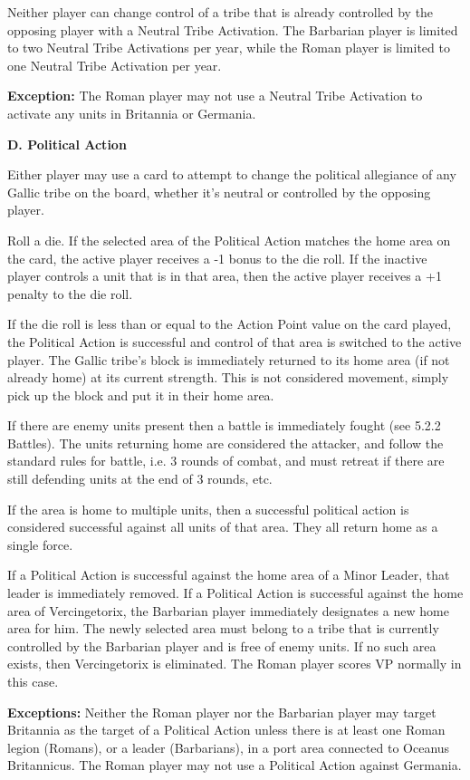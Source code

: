 Neither player can change control of a tribe that is already controlled by the opposing player with a Neutral Tribe Activation. The Barbarian player is limited to two Neutral Tribe Activations per year, while the Roman player is limited to one Neutral Tribe Activation per year.

\textbf{Exception:} The Roman player may not use a Neutral Tribe Activation to activate any units in Britannia or Germania.

\textbf{D. Political Action}
\par
Either player may use a card to attempt to change the political allegiance of any Gallic tribe on the board, whether it's neutral or controlled by the opposing player.

Roll a die. If the selected area of the Political Action matches the home area on the card, the active player receives a -1 bonus to the die roll. If the inactive player controls a unit that is in that area, then the active player receives a +1 penalty to the die roll.

If the die roll is less than or equal to the Action Point value on the card played, the Political Action is successful and control of that area is switched to the active player. The Gallic tribe's block is immediately returned to its home area (if not already home) at its current strength. This is not considered movement, simply pick up the block and put it in their home area.

If there are enemy units present then a battle is immediately fought (see 5.2.2 Battles). The units returning home are considered the attacker, and follow the standard rules for battle, i.e. 3 rounds of combat, and must retreat if there are still defending units at the end of 3 rounds, etc.

If the area is home to multiple units, then a successful political action is considered successful against all units of that area. They all return home as a single force.

If a Political Action is successful against the home area of a Minor Leader, that leader is immediately removed. If a Political Action is successful  against the home area of Vercingetorix, the Barbarian player immediately designates a new home area for him. The newly selected area must belong to a tribe that is currently controlled by the Barbarian player and is free of enemy units. If no such area exists, then Vercingetorix is eliminated. The Roman player scores VP normally in this case.

\textbf{Exceptions:} Neither the Roman player nor the Barbarian player may target Britannia as the target of a Political Action unless there is at least one Roman legion (Romans), or a leader (Barbarians), in a port area connected to Oceanus Britannicus. The Roman player may not use a Political Action against Germania.

